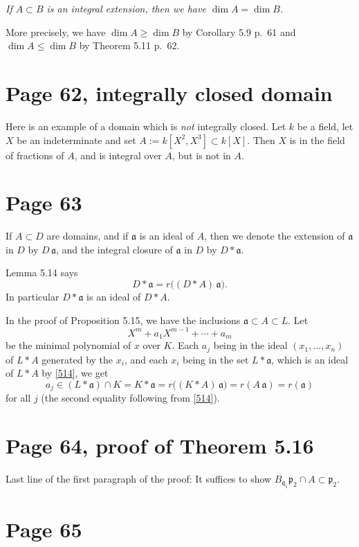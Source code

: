 \documentclass[parskip=half]{scrartcl}%
\newcommand{\mf}{\mathfrak}
\begin{document}
\emph{If $A\subset B$ is an integral extension, then we have $\dim A=\dim B$.}

More precisely, we have $\dim A\ge\dim B$ by Corollary 5.9 p.~61 and $\dim A\le\dim B$ by Theorem 5.11 p.~62.

\section{Page 62, integrally closed domain}%

Here is an example of a domain which is \emph{not} integrally closed. Let $k$ be a field, let $X$ be an indeterminate and set $A:=k[X^2,X^3]\subset k[X]$. Then $X$ is in the field of fractions of $A$, and is integral over $A$, but is not in $A$.

\section{Page 63}%

If $A\subset D$ are domains, and if $\mf a$ is an ideal of $A$, then we denote the extension of $\mf a$ in $D$ by $D\,\mf a$, and the integral closure of $\mf a$ in $D$ by $D*\mf a$. 

Lemma 5.14 says
\begin{equation}\label{514}
D*\mf a=r\Big((D*A)\,\mf a\Big).
\end{equation}
In particular $D*\mf a$ is an ideal of $D*A$. 

In the proof of Proposition 5.15, we have the inclusions $\mf a\subset A\subset L$. Let 
$$
X^m+a_1X^{m-1}+\cdots+a_m
$$ 
be the minimal polynomial of $x$ over $K$. Each $a_j$ being in the ideal $(x_1,\dots,x_n)$ of $L*A$ generated by the $x_i$, and each $x_i$ being in the set $L*\mf a$, which is an ideal of $L*A$ by \eqref{514}, we get 
$$
a_j\in(L*\mf a)\cap K=K*\mf a=r\Big((K*A)\,\mf a\Big)=r(A\,\mf a)=r(\mf a)
$$ 
for all $j$ (the second equality following from \eqref{514}).

\section{Page 64, proof of Theorem 5.16}%

Last line of the first paragraph of the proof: It suffices to show $B_{\mf q_1}\mf p_2\cap A\subset\mf p_2$.

\section{Page 65}%
\end{document}
